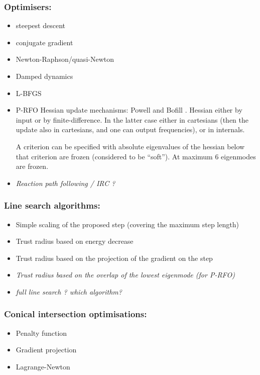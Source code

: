 \documentclass{article}
\begin{document}
\subsubsection{Optimisers:}
\begin{itemize}
\item steepest descent
\item conjugate gradient
\item Newton-Raphson/quasi-Newton
\item Damped dynamics
\item L-BFGS
\item P-RFO Hessian update mechanisms: Powell \cite{pow71} and Bofill
  \cite{bof94}. Hessian either by input or by finite-difference. In the latter
  case either in cartesians (then the update also in cartesians, and one can
  output frequencies), or in internals.

  A criterion can be specified with absolute eigenvalues of the hessian below
  that criterion are frozen (considered to be ``soft''). At maximum 6
  eigenmodes are frozen.
\item \emph{Reaction path following / IRC ?}
\end{itemize}

\subsubsection{Line search algorithms:}
\begin{itemize}
\item Simple scaling of the proposed step (covering the maximum step length)
\item Trust radius based on energy decrease
\item Trust radius based on the projection of the gradient on the step
\item \emph{Trust radius based on the overlap of the lowest eigenmode (for P-RFO)}
\item \emph{full line search ? which algorithm?}
\end{itemize}

\subsubsection{Conical intersection optimisations:}
\begin{itemize}
\item Penalty function
\item Gradient projection
\item Lagrange-Newton
\end{itemize}
\end{document}
